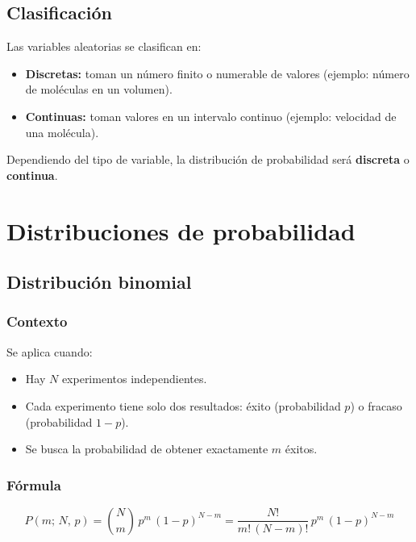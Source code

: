 \subsection{Clasificación}

Las variables aleatorias se clasifican en:

\begin{itemize}
    \item \textbf{Discretas:} toman un número finito o numerable de valores (ejemplo: número de moléculas en un volumen).
    \item \textbf{Continuas:} toman valores en un intervalo continuo (ejemplo: velocidad de una molécula).
\end{itemize}

Dependiendo del tipo de variable, la distribución de probabilidad será \textbf{discreta} o \textbf{continua}.

\section{Distribuciones de probabilidad}

\subsection{Distribución binomial}

\subsubsection{Contexto}

Se aplica cuando:
\begin{itemize}
    \item Hay $N$ experimentos independientes.
    \item Cada experimento tiene solo dos resultados: éxito (probabilidad $p$) o fracaso (probabilidad $1-p$).
    \item Se busca la probabilidad de obtener exactamente $m$ éxitos.
\end{itemize}

\subsubsection{Fórmula}

$$
P(m;\, N,\, p) = \binom{N}{m}\, p^m\, (1-p)^{N-m} = \frac{N!}{m!\,(N-m)!}\, p^m\, (1-p)^{N-m}
$$

